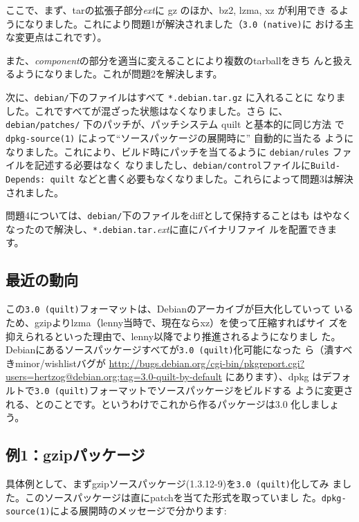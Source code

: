 \documentclass[mingoth,a4paper]{jsarticle}
\begin{document}
ここで、まず、tarの拡張子部分\textit{ext}に gz のほか、bz2, lzma, xz が利用でき
るようになりました。これにより問題1が解決されました（\verb|3.0 (native)|に
おける主な変更点はこれです）。

また、\textit{component}の部分を適当に変えることにより複数のtarballをきち
んと扱えるようになりました。これが問題2を解決します。

次に、\verb|debian/|下のファイルはすべて \verb|*.debian.tar.gz| に入れることに
なりました。これですべてが混ざった状態はなくなりました。さら
に、\verb|debian/patches/| 下のパッチが、パッチシステム quilt と基本的に同じ方法
で \verb|dpkg-source(1)| によって``ソースパッケージの展開時に'' 自動的に当たる
ようになりました。これにより、ビルド時にパッチを当てるように \verb|debian/rules| ファイルを記述する必要はなく
なりましたし、\verb|debian/control|ファイルに\verb|Build-Depends: quilt|
などと書く必要もなくなりました。これらによって問題3は解決されました。

問題4については、\verb|debian/|下のファイルをdiffとして保持することはも
はやなくなったので解決し、\verb|*.debian.tar.|\textit{ext}に直にバイナリファイ
ルを配置できます。

\subsection{最近の動向}
この\verb|3.0 (quilt)|フォーマットは、Debianのアーカイブが巨大化していって
いるため、gzipよりlzma（lenny当時で、現在ならxz）を使って圧縮すればサイ
ズを抑えられるといった理由で、lenny以降でより推進されるようになりまし
た。Debianにあるソースパッケージすべてが\verb|3.0 (quilt)|化可能になった
ら（潰すべきminor/wishlistバグが
\url{http://bugs.debian.org/cgi-bin/pkgreport.cgi?users=hertzog@debian.org;tag=3.0-quilt-by-default}
にあります）、dpkg
はデフォルトで\verb|3.0 (quilt)|フォーマットでソースパッケージをビルドする
ように変更される、とのことです。というわけでこれから作るパッケージは3.0
化しましょう。

\subsection{例1：gzipパッケージ}
具体例として、まずgzipソースパッケージ(1.3.12-9)を\verb|3.0 (quilt)|化してみ
ました。このソースパッケージは直にpatchを当てた形式を取っていまし
た。\verb|dpkg-source(1)|による展開時のメッセージで分かります:
\end{document}
